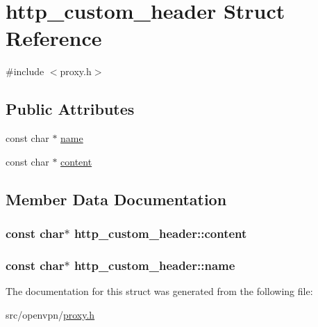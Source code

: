 \hypertarget{structhttp__custom__header}{}\section{http\+\_\+custom\+\_\+header Struct Reference}
\label{structhttp__custom__header}


{\ttfamily \#include $<$proxy.\+h$>$}

\subsection*{Public Attributes}
\begin{DoxyCompactItemize}
\item 
const char $\ast$ \hyperlink{structhttp__custom__header_a97fd7b7dd620504d140d146affb1a631}{name}
\item 
const char $\ast$ \hyperlink{structhttp__custom__header_aaef4fe96b7b47f4c4b5d521534ce9bea}{content}
\end{DoxyCompactItemize}


\subsection{Member Data Documentation}
\hypertarget{structhttp__custom__header_aaef4fe96b7b47f4c4b5d521534ce9bea}{}
\subsubsection[{content}]{\setlength{\rightskip}{0pt plus 5cm}const char$\ast$ http\+\_\+custom\+\_\+header\+::content}\label{structhttp__custom__header_aaef4fe96b7b47f4c4b5d521534ce9bea}
\hypertarget{structhttp__custom__header_a97fd7b7dd620504d140d146affb1a631}{}
\subsubsection[{name}]{\setlength{\rightskip}{0pt plus 5cm}const char$\ast$ http\+\_\+custom\+\_\+header\+::name}\label{structhttp__custom__header_a97fd7b7dd620504d140d146affb1a631}


The documentation for this struct was generated from the following file\+:\begin{DoxyCompactItemize}
\item 
src/openvpn/\hyperlink{proxy_8h}{proxy.\+h}\end{DoxyCompactItemize}
